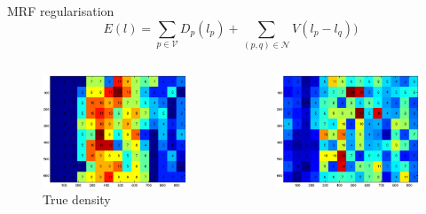 \documentclass[11pt)]{beamer}
\begin{document}
\begin{frame}{MRF regularisation}
$$E(l) = \sum_{p \in \mathcal{V}}D_p(l_p) + \sum_{(p,q)\in \mathcal{N}}V(l_p-l_q))$$
\begin{columns}[t]
	\begin{column}{.33\textwidth}
		\begin{figure}[ht]
			\centering
			\includegraphics[width=\textwidth]{mrf_true.eps}
			\caption{True density}
		\end{figure}
	\end{column}
	\begin{column}{.33\textwidth}
		\begin{figure}[ht]
			\centering
			\includegraphics[width=\textwidth]{mrf_before.eps}

\end{figure}
\end{column}
\end{columns}
\end{frame}
\end{document}
